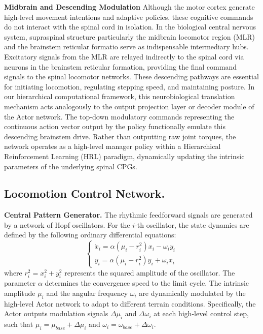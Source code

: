 \documentclass[lettersize,journal]{IEEEtran}
\begin{document}
\textbf{Midbrain and Descending Modulation}
Although the motor cortex generate high-level movement intentions and adaptive policies, these cognitive commands do not interact with the spinal cord in isolation.
In the biological central nervous system, supraspinal structure particularly the midbrain locomotor region (MLR) and the brainstem reticular formatio serve as indispensable intermediary hubs. 
Excitatory signals from the MLR are relayed indirectly to the spinal cord via neurons in the brainstem reticular formation, providing the final command signals to the spinal locomotor networks. 
These descending pathways are essential for initiating locomotion, regulating stepping speed, and maintaining posture. 
In our hierarchical computational framework, this neurobiological translation mechanism acts analogously to the output projection layer or decoder module of the Actor network. 
The top-down modulatory commands representing the continuous action vector output by the policy functionally emulate this descending brainstem drive. 
Rather than outputting raw joint torques, the network operates as a high-level manager policy within a Hierarchical Reinforcement Learning (HRL) paradigm, dynamically updating the intrinsic parameters of the underlying spinal CPGs. 

\subsection{Locomotion Control Network.}
\textbf{Central Pattern Generator.}
The rhythmic feedforward signals are generated by a network of Hopf oscillators. 
For the $i$-th oscillator, the state dynamics are defined by the following ordinary differential equations:
\begin{equation}
\begin{cases}
    \dot{x}_i = \alpha (\mu_i - r_i^2) x_i - \omega_i y_i \\
    \dot{y}_i = \alpha (\mu_i - r_i^2) y_i + \omega_i x_i
\end{cases}
\end{equation}
where $r_i^2 = x_i^2 + y_i^2$ represents the squared amplitude of the oscillator. 
The parameter $\alpha$ determines the convergence speed to the limit cycle. 
The intrinsic amplitude $\mu_i$ and the angular frequency $\omega_i$ are dynamically modulated by the high-level Actor network to adapt to different terrain conditions. 
Specifically, the Actor outputs modulation signals $\Delta \mu_i$ and $\Delta \omega_i$ at each high-level control step, such that $\mu_i = \mu_{base} + \Delta \mu_i$ and $\omega_i = \omega_{base} + \Delta \omega_i$.
\end{document}
